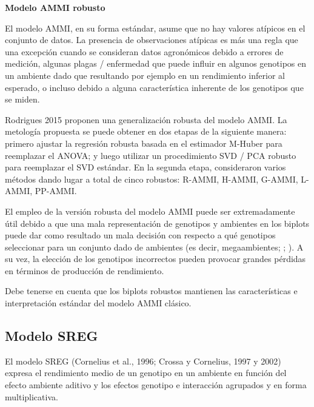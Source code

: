 \textbf{Modelo AMMI robusto}

El modelo AMMI, en su forma estándar, asume que no hay valores atípicos en el conjunto de datos. La presencia de observaciones atípicas es más una regla que una excepción cuando se consideran datos agronómicos debido a errores de medición, algunas plagas / enfermedad que puede influir en algunos genotipos en un ambiente dado que resultando por ejemplo en un rendimiento inferior al esperado, o incluso debido a alguna característica inherente de los genotipos que se miden.

Rodrigues 2015 proponen una generalización robusta del modelo AMMI. La metología propuesta se puede obtener en dos etapas de la siguiente manera: primero ajustar la regresión robusta basada
en el estimador M-Huber \citep{Huber1981} para reemplazar el ANOVA; y luego utilizar un procedimiento SVD / PCA robusto para reemplazar el SVD estándar. En la segunda etapa, consideraron varios métodos dando lugar a total de cinco robustos: R-AMMI, H-AMMI, G-AMMI, L-AMMI, PP-AMMI. 

El empleo de la versión robusta del modelo AMMI puede ser extremadamente útil debido a que una mala representación de genotipos y ambientes en los biplots puede dar como resultado un mala decisión con respecto a qué genotipos seleccionar para un conjunto dado de ambientes (es decir, megaambientes; \cite{Gauch1997}; \cite{Yanetal2000}). A su vez, la elección de los genotipos incorrectos pueden provocar grandes pérdidas en términos de producción de rendimiento.

Debe tenerse en cuenta que los biplots robustos mantienen las características e interpretación estándar del modelo AMMI clásico.

\subsection{Modelo SREG}

El modelo SREG (Cornelius et al., 1996; Crossa y Cornelius, 1997 y 2002) expresa el rendimiento medio de un genotipo en un ambiente en función del efecto ambiente aditivo y los efectos genotipo e interacción agrupados y en forma multiplicativa.


